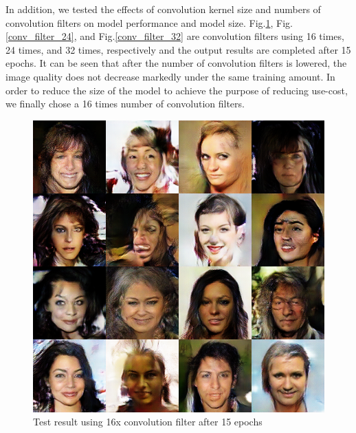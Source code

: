 In addition, we tested the effects of convolution kernel size and numbers of convolution filters on model performance and model size.
Fig.\ref{conv_filter_16}, Fig.\ref{conv_filter_24}, and Fig.\ref{conv_filter_32} are convolution filters using 16 times, 24 times, and 32 times,
    respectively and the output results are completed after 15 epochs.
It can be seen that after the number of convolution filters is lowered,
    the image quality does not decrease markedly under the same training amount.
In order to reduce the size of the model to achieve the purpose of reducing use-cost,
    we finally chose a 16 times number of convolution filters.

\begin{figure}
    \begin{minipage}[t]{0.48\linewidth}
        \centering
        \includegraphics[width=\textwidth]{figures/result_conv_filter_16.png}
        \caption{Test result using 16x convolution filter after 15 epochs}
        \label{conv_filter_16}
    \end{minipage}
        \hfill
    \begin{minipage}[t]{0.48\linewidth}
        \centering

\end{minipage}
\end{figure}
